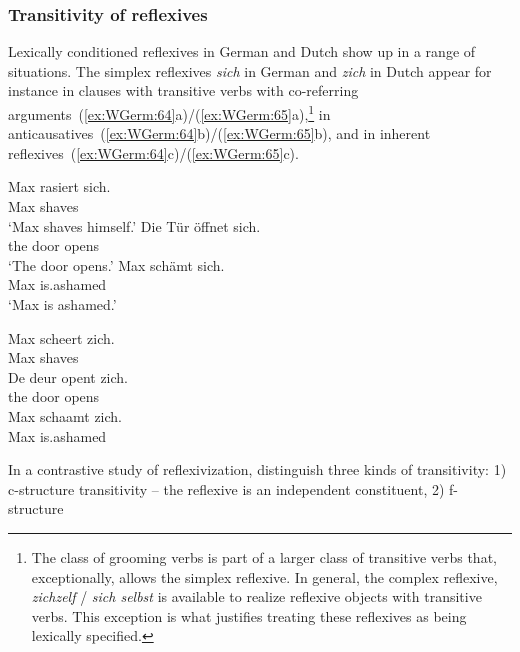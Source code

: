 \documentclass[output=paper,hidelinks]{langscibook}
\begin{document}
\subsubsection{Transitivity of reflexives}

Lexically conditioned reflexives in German and Dutch show up in a
range of situations. The simplex reflexives \textit{sich} in German
and \textit{zich} in Dutch appear for instance in clauses with transitive verbs
with co-referring arguments~(\ref{ex:WGerm:64}a)/(\ref{ex:WGerm:65}a),\footnote{The class
of grooming verbs is part of a larger class of transitive verbs that,
exceptionally, allows the simplex reflexive. In
general, the complex reflexive, \textit{zichzelf} /
\textit{sich selbst} is available to realize reflexive objects with
transitive verbs. This exception is what justifies treating these
reflexives as being lexically specified.} in
anticausatives~(\ref{ex:WGerm:64}b)/(\ref{ex:WGerm:65}b), and in inherent
reflexives~(\ref{ex:WGerm:64}c)/(\ref{ex:WGerm:65}c).
%
\begin{exe}
  \ex\label{ex:WGerm:64}
  \begin{xlist}
    \ex\label{ex:Germ:64a} \gll Max rasiert sich.\\
             Max shaves \REFL{}\\ 
         \glt `Max shaves himself.'
    \ex \gll Die Tür öffnet sich.\\
             the door opens \REFL{}\\
        \glt `The door opens.'
    \ex \gll Max schämt sich.\\
             Max is.ashamed \REFL{}\\
        \glt `Max is ashamed.'
  \end{xlist}
  \ex\label{ex:WGerm:65}
  \begin{xlist}
    \ex\label{ex:Germ:65a} \gll Max scheert zich.\\
        Max shaves \REFL{}\\ 
    \ex \gll De deur opent zich.\\
    the door opens \REFL{}\\
    \ex \gll Max schaamt zich.\\
    Max is.ashamed \REFL{}\\
  \end{xlist}
\end{exe}
%
\largerpage
In a contrastive study of reflexivization, \citet{Sells1987-xz}
distinguish three kinds of transitivity: 1) c-structure transitivity
-- the reflexive is an independent constituent, 2) f-structure
\end{document}
